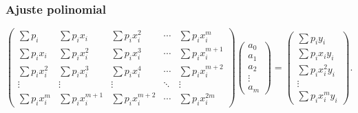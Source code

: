\documentclass[letterpaper,11pt]{report}
\begin{document}
\subsubsection{Ajuste polinomial}

\begin{equation}
\left(\begin{array}{ccccc}
\sum p_i & \sum p_ix_i &  \sum p_ix_i^2 & \cdots & \sum p_ix_i^m \\
\sum p_ix_i &  \sum p_ix_i^2 &  \sum p_ix_i^3 & \cdots & \sum p_ix_i^{m+1} \\
\sum p_ix^2_i &  \sum p_ix_i^3 &  \sum p_ix_i^4 & \cdots & \sum p_ix_i^{m+2} \\
\vdots & \vdots & \vdots & \ddots & \vdots \\
\sum p_ix_i^m &  \sum p_ix_i^{m+1}&  \sum p_ix_i^{m+2} & \cdots & \sum p_ix_i^{2m}
\end{array}
\right)\left(\begin{array}{c}a_0\\a_1\\a_2\\ \vdots\\a_m\end{array}\right)
=\left(\begin{array}{c}
\sum p_iy_i\\ \sum p_ix_iy_i\\ \sum p_ix_i^2y_i\\ \vdots\\ \sum p_ix_i^m y_i\end{array}\right).
\end{equation}
\end{document}
